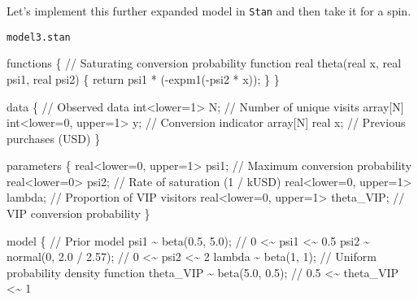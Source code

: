 \documentclass[
  letterpaper,
  DIV=11,
  numbers=noendperiod]{scrartcl}
\newenvironment{Shaded}{\begin{snugshade}}{\end{snugshade}}
\newcommand{\CommentTok}[1]{\textcolor[rgb]{0.37,0.37,0.37}{#1}}
\newcommand{\ControlFlowTok}[1]{\textcolor[rgb]{0.00,0.23,0.31}{#1}}
\newcommand{\DataTypeTok}[1]{\textcolor[rgb]{0.68,0.00,0.00}{#1}}
\newcommand{\DecValTok}[1]{\textcolor[rgb]{0.68,0.00,0.00}{#1}}
\newcommand{\FloatTok}[1]{\textcolor[rgb]{0.68,0.00,0.00}{#1}}
\newcommand{\KeywordTok}[1]{\textcolor[rgb]{0.00,0.23,0.31}{#1}}
\newcommand{\NormalTok}[1]{\textcolor[rgb]{0.00,0.23,0.31}{#1}}
\begin{document}
Let's implement this further expanded model in \texttt{Stan} and then
take it for a spin.

\begin{codelisting}

\caption{\texttt{model3.stan}}

\begin{Shaded}
\begin{Highlighting}[]
\KeywordTok{functions}\NormalTok{ \{}
  \CommentTok{// Saturating conversion probability function}
  \DataTypeTok{real}\NormalTok{ theta(}\DataTypeTok{real}\NormalTok{ x, }\DataTypeTok{real}\NormalTok{ psi1, }\DataTypeTok{real}\NormalTok{ psi2) \{}
    \ControlFlowTok{return}\NormalTok{ psi1 * ({-}expm1({-}psi2 * x));}
\NormalTok{  \}}
\NormalTok{\}}

\KeywordTok{data}\NormalTok{ \{}
  \CommentTok{// Observed data}
  \DataTypeTok{int}\NormalTok{\textless{}}\KeywordTok{lower}\NormalTok{=}\DecValTok{1}\NormalTok{\textgreater{} N;                    }\CommentTok{// Number of unique visits}
  \DataTypeTok{array}\NormalTok{[N] }\DataTypeTok{int}\NormalTok{\textless{}}\KeywordTok{lower}\NormalTok{=}\DecValTok{0}\NormalTok{, }\KeywordTok{upper}\NormalTok{=}\DecValTok{1}\NormalTok{\textgreater{} y;  }\CommentTok{// Conversion indicator}
  \DataTypeTok{array}\NormalTok{[N] }\DataTypeTok{real}\NormalTok{ x;                   }\CommentTok{// Previous purchases (USD)}
\NormalTok{\}}

\KeywordTok{parameters}\NormalTok{ \{}
  \DataTypeTok{real}\NormalTok{\textless{}}\KeywordTok{lower}\NormalTok{=}\DecValTok{0}\NormalTok{, }\KeywordTok{upper}\NormalTok{=}\DecValTok{1}\NormalTok{\textgreater{} psi1;      }\CommentTok{// Maximum conversion probability}
  \DataTypeTok{real}\NormalTok{\textless{}}\KeywordTok{lower}\NormalTok{=}\DecValTok{0}\NormalTok{\textgreater{} psi2;               }\CommentTok{// Rate of saturation (1 / kUSD)}
  \DataTypeTok{real}\NormalTok{\textless{}}\KeywordTok{lower}\NormalTok{=}\DecValTok{0}\NormalTok{, }\KeywordTok{upper}\NormalTok{=}\DecValTok{1}\NormalTok{\textgreater{} lambda;    }\CommentTok{// Proportion of VIP visitors}
  \DataTypeTok{real}\NormalTok{\textless{}}\KeywordTok{lower}\NormalTok{=}\DecValTok{0}\NormalTok{, }\KeywordTok{upper}\NormalTok{=}\DecValTok{1}\NormalTok{\textgreater{} theta\_VIP; }\CommentTok{// VIP conversion probability}
\NormalTok{\}}

\KeywordTok{model}\NormalTok{ \{}
  \CommentTok{// Prior model}
\NormalTok{  psi1 \textasciitilde{} beta(}\FloatTok{0.5}\NormalTok{, }\FloatTok{5.0}\NormalTok{);        }\CommentTok{// 0   \textless{}\textasciitilde{}    psi1   \textless{}\textasciitilde{} 0.5}
\NormalTok{  psi2 \textasciitilde{} normal(}\DecValTok{0}\NormalTok{, }\FloatTok{2.0}\NormalTok{ / }\FloatTok{2.57}\NormalTok{); }\CommentTok{// 0   \textless{}\textasciitilde{}    psi2   \textless{}\textasciitilde{} 2}
\NormalTok{  lambda \textasciitilde{} beta(}\DecValTok{1}\NormalTok{, }\DecValTok{1}\NormalTok{);          }\CommentTok{// Uniform probability density function}
\NormalTok{  theta\_VIP \textasciitilde{} beta(}\FloatTok{5.0}\NormalTok{, }\FloatTok{0.5}\NormalTok{);   }\CommentTok{// 0.5 \textless{}\textasciitilde{} theta\_VIP \textless{}\textasciitilde{} 1}


\end{Highlighting}
\end{Shaded}
\end{codelisting}
\end{document}
